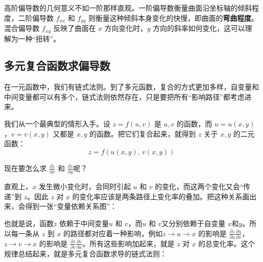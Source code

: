高阶偏导数的几何意义不如一阶那样直观。一阶偏导数衡量曲面沿坐标轴的倾斜程度，二阶偏导数 $f_{xx}$ 和 $f_{yy}$ 则衡量这种倾斜本身变化的快慢，即曲面的\textbf{弯曲程度}。混合偏导数 $f_{xy}$ 反映了曲面在 $x$ 方向变化时，$y$ 方向的斜率如何变化，这可以理解为一种“扭转”。



\subsection{多元复合函数求偏导数}

在一元函数中，我们有链式法则。到了多元函数，复合的方式更加多样，自变量和中间变量都可以有多个，链式法则依然存在，只是要把所有“影响路径”都考虑进来。

我们从一个最典型的情形入手。设 $z = f(u,v)$ 是 $u,v$ 的函数，而 $u = u(x,y)$，$v = v(x,y)$ 又都是 $x,y$ 的函数。把它们复合起来，就得到 $z$ 关于 $x,y$ 的二元函数：
\[
z = f(u(x,y),\, v(x,y))
\]

现在要怎么求 $\frac{\partial z}{\partial x}$ 和 $\frac{\partial z}{\partial y}$呢？

直观上，$x$ 发生微小变化时，会同时引起 $u$ 和 $v$ 的变化，而这两个变化又会“传递”到 $z$。因此 $z$ 对 $x$ 的变化率应该是两条路径上变化率的叠加。把这种关系画出来，会得到一张“变量依赖关系图”：

\begin{center}
\end{center}

也就是说，函数$z$ 依赖于中间变量$u$ 和 $v$，而$u$ 和 $v$又分别依赖于自变量 $x$和$y$。所以每一条从 $z$ 到 $x$ 的路径都对应着一种影响，例如$z \to u \to x$ 的影响是 $\frac{\partial z}{\partial u}\frac{\partial u}{\partial x}$，$z \to v \to x$ 的影响是 $\frac{\partial z}{\partial v}\frac{\partial v}{\partial x}$。所有这些影响加起来，就是 $z$ 对 $x$ 的总变化率。这个规律总结起来，就是多元复合函数求导的链式法则：

